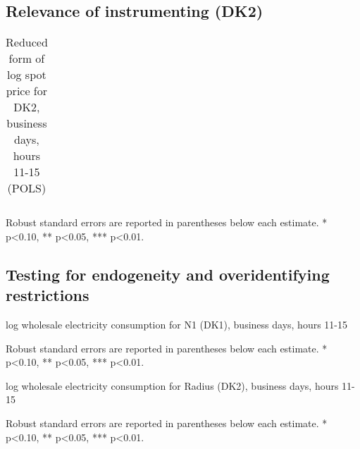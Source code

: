 \clearpage

\subsection{Relevance of instrumenting (DK2)}
\label{app:relevance}

\begin{table}[H]
\begin{threeparttable}
  \centering
  \caption{Reduced form of log spot price for DK2, business days, hours 11-15 (POLS)}
  \label{tab:reduced_form_price_dk2}
  \footnotesize
  \begin{tabular}{lcccc}
         
  \end{tabular}
    \begin{tablenotes}
        \item Robust standard errors are reported in parentheses below each estimate. * p<0.10, ** p<0.05, *** p<0.01.
    \end{tablenotes}
\end{threeparttable}
\end{table}

\clearpage

\subsection{Testing for endogeneity and overidentifying restrictions}
\label{app:endog_overid}
\begin{table}[H]
\centering
\begin{threeparttable}
  \caption{log wholesale electricity consumption for N1 (DK1), business days, hours 11-15}
  \label{tab:ws_endog_overid_131}
  \footnotesize
    
    \begin{tablenotes}
    \item Robust standard errors are reported in parentheses below each estimate. * p<0.10, ** p<0.05, *** p<0.01.
  \end{tablenotes}
\end{threeparttable}
\end{table}
\begin{table}[H]
\centering
\begin{threeparttable}
  \caption{log wholesale electricity consumption for Radius (DK2), business days, hours 11-15}
  \label{tab:ws_endog_overid_791}
  \footnotesize
    
    \begin{tablenotes}
    \item Robust standard errors are reported in parentheses below each estimate. * p<0.10, ** p<0.05, *** p<0.01.
  \end{tablenotes}
\end{threeparttable}
\end{table}
